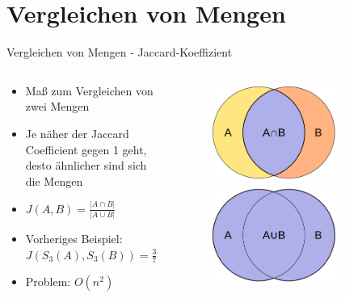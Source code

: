 \section{Vergleichen von Mengen}

\begin{frame}{Vergleichen von Mengen - Jaccard-Koeffizient}
    \begin{columns} %
        \begin{column}{.60\textwidth}
            \begin{itemize}
                \item Maß zum Vergleichen von zwei Mengen
                \item Je näher der Jaccard Coefficient gegen 1 geht, desto ähnlicher sind sich die Mengen
                \item $ J(A,B) = \frac{ | A \cap B | }{ | A \cup B | } $
                \item Vorheriges Beispiel: $ J(S_3(A),S_3(B)) = \frac{3}{7} \approx 0.43 $
                \item Problem: $ O(n^2) $
            \end{itemize}
        \end{column}
        \hfill
        \begin{column}{.40\textwidth}
            \begin{figure}[H]
                \centering
                \includegraphics[width=0.75\textwidth]{images/Intersection_of_sets_A_and_B.png} 
                \includegraphics[width=0.75\textwidth]{images/Union_of_sets_A_and_B.png}

\end{figure}
\end{column}
\end{columns}
\end{frame}
